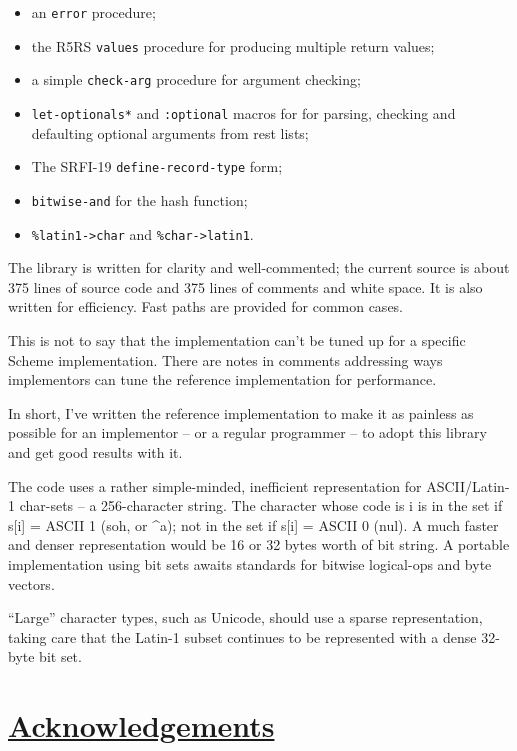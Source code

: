 \begin{itemize}
\tightlist
\item
  an \texttt{error} procedure;
\item
  the R5RS \texttt{values} procedure for producing multiple return
  values;
\item
  a simple \texttt{check-arg} procedure for argument checking;
\item
  \texttt{let-optionals*} and \texttt{:optional} macros for for parsing,
  checking and defaulting optional arguments from rest lists;
\item
  The SRFI-19 \texttt{define-record-type} form;
\item
  \texttt{bitwise-and} for the hash function;
\item
  \texttt{\%latin1-\textgreater{}char} and
  \texttt{\%char-\textgreater{}latin1}.
\end{itemize}

The library is written for clarity and well-commented; the current
source is about 375 lines of source code and 375 lines of comments and
white space. It is also written for efficiency. Fast paths are provided
for common cases.

This is not to say that the implementation can't be tuned up for a
specific Scheme implementation. There are notes in comments addressing
ways implementors can tune the reference implementation for performance.

In short, I've written the reference implementation to make it as
painless as possible for an implementor -- or a regular programmer -- to
adopt this library and get good results with it.

The code uses a rather simple-minded, inefficient representation for
ASCII/Latin-1 char-sets -- a 256-character string. The character whose
code is i is in the set if s{[}i{]} = ASCII 1 (soh, or \^{}a); not in
the set if s{[}i{]} = ASCII 0 (nul). A much faster and denser
representation would be 16 or 32 bytes worth of bit string. A portable
implementation using bit sets awaits standards for bitwise logical-ops
and byte vectors.

``Large'' character types, such as Unicode, should use a sparse
representation, taking care that the Latin-1 subset continues to be
represented with a dense 32-byte bit set.

\section{\texorpdfstring{\href{}{Acknowledgements}}{Acknowledgements}}\label{acknowledgements}


